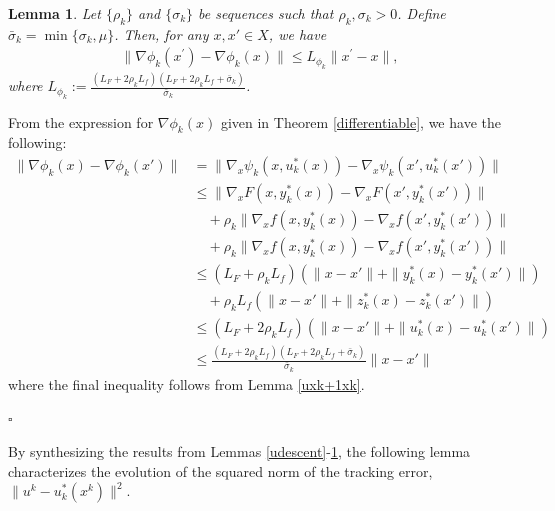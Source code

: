\documentclass{article}
\newtheorem{lemma}[theorem]{Lemma}
\newenvironment{proof}[1][Proof]{\par
	\normalfont\topsep6pt\relax
	\trivlist\item[\hskip\labelsep\itshape #1.]\ignorespaces
}{%
	\hfill\ensuremath{\square}\endtrivlist
}
\def\x{x}
\begin{document}
       \begin{lemma}\label{Lipshitzofphi}
       Let $\{\rho_k\}$ and $\{\sigma_k\}$ be sequences such that  $ \rho_{k}, \sigma_{k} >0$. Define $\bar{\sigma}_k = \min\{\sigma_k, \mu\}$. Then, for any $x, x'\in X$, we have  
	 	\begin{align}
	 		\|\nabla \phi_k(\x^\prime)-\nabla \phi_k(\x)\|\le L_{\phi_k}\|\x^\prime-\x\|,
	 	\end{align}
	 	where $L_{\phi_k}:= \frac{(L_F + 2\rho_kL_f)(L_{F}+2\rho_kL_{f} + \bar{\sigma}_k)}{\bar{\sigma}_k} $.
	 \end{lemma}
	 \begin{proof}
     From the expression for $\nabla\phi_{k}(x)$ given in Theorem \ref{differentiable}, we have the following:
     \begin{equation}
         \begin{aligned}
             \| \nabla\phi_{k}(x) - \nabla\phi_{k}(x')\| &= \| \nabla_x \psi_{k}(x, u_k^*(x)) - \nabla_x\psi_{k}(x', u_k^*(x'))\| \\
             & \le \| \nabla_x F(x,y_k^*(x)) -  \nabla_x F(x',y_k^*(x'))\|\\&\quad  + \rho_k \| \nabla_x f(x,y_k^*(x)) -  \nabla_x f(x',y_k^*(x')) \|\\
             & \quad + \rho_k \| \nabla_x f(x,y_k^*(x)) -  \nabla_x f(x',y_k^*(x')) \| \\
             & \le (L_F + \rho_kL_f)(\|x - x'\| + \|y_k^*(x) - y_k^*(x')\|) \\
             &\quad + \rho_kL_f(\|x - x'\| + \|z_k^*(x) - z_k^*(x')\|) \\
             & \le (L_F + 2\rho_kL_f)(\|x - x'\| + \|u_k^*(x) - u_k^*(x')\|) \\
             & \le \frac{(L_F + 2\rho_kL_f)(L_{F}+2\rho_kL_{f} + \bar{\sigma}_k)}{\bar{\sigma}_k} \|x - x'\|
         \end{aligned}
     \end{equation}
     where the final inequality follows from Lemma \ref{uxk+1xk}.
	
	 \end{proof}


    
     

      By synthesizing the results from Lemmas \ref{udescent}-\ref{Lipshitzofphi}, the following lemma characterizes the evolution of the squared norm of the tracking error, $\|u^{k}-u_{k}^*(x^{k})\|^2$.
\end{document}
